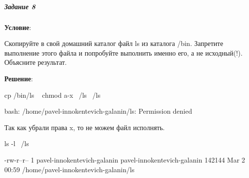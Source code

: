 \subparagraph{Задание 8} \textbf{Условие}:

Скопируйте в свой домашний каталог файл ls из каталога /bin. Запретите выполнение этого файла и попробуйте выполнить именно его, а не исходный(!).
Объясните результат.

\textbf{Решение}:

\begin{BashBox}
    cp /bin/ls ~
    chmod a-x ~/ls
    ~/ls
\end{BashBox}

\begin{OutBox}
    bash: /home/pavel-innokentevich-galanin/ls: Permission denied
\end{OutBox}

Так как убрали права x, то не можем файл исполнять.

\begin{BashBox}
    ls -l ~/ls
\end{BashBox}

\begin{OutBox}
    -rw-r--r-- 1 pavel-innokentevich-galanin pavel-innokentevich-galanin 142144 Mar  2 00:59 /home/pavel-innokentevich-galanin/ls
\end{OutBox}
